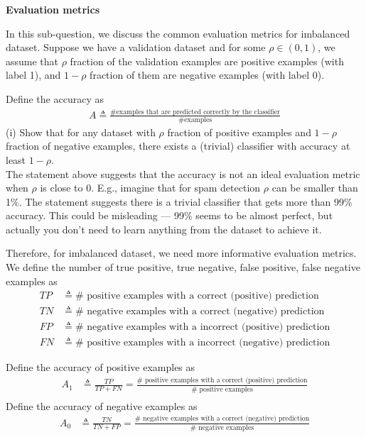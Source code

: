 \item \textbf{Evaluation metrics}

In this sub-question, we discuss the common evaluation metrics for imbalanced dataset. Suppose we have a validation dataset and for some $\rho \in (0,1)$, we assume that $\rho$ fraction of the validation examples are positive examples (with label 1), and $1-\rho$ fraction of them are negative examples (with label 0). 


Define the accuracy as
\begin{align*}
A \triangleq %
\frac{\# \textrm{examples that are predicted correctly by the classifier}}{\# \textrm{examples}} 
\end{align*}
(i)  Show that for any dataset with $\rho$ fraction of positive examples and $1-\rho$ fraction of negative examples, there exists a (trivial) classifier with accuracy at least $1-\rho$. 
\newline
\\
The statement above suggests that the accuracy is not an ideal evaluation metric when $\rho$ is close to 0. E.g., imagine that for spam detection $\rho$ can be smaller than 1\%. The statement suggests there is a trivial classifier that gets more than 99\% accuracy. This could be misleading ---  99\% seems to be almost perfect, but actually you don't need to learn anything from the dataset to achieve it. 

Therefore, for imbalanced dataset, we need more informative evaluation metrics. We define the number of true positive, true negative, false positive, false negative examples as
\begin{align*}
TP & \triangleq \# \textrm{ positive examples with a correct (positive) prediction} \\
TN & \triangleq \# \textrm{ negative examples with a correct (negative) prediction} \\
FP & \triangleq \# \textrm{ negative examples with a incorrect (positive) prediction} \\
FN & \triangleq \# \textrm{ positive examples with a incorrect (negative) prediction} 
\end{align*}

Define the accuracy of positive examples  as 
\newcommand{\recall}{\textup{recall}}
\begin{align*}
A_1 &\triangleq \frac{TP}{TP + FN} = \frac{\#  \textrm{ positive examples with a correct (positive) prediction}}{\# \textrm{ positive examples}}\nonumber\\
\end{align*}
Define the accuracy of negative examples as 
\begin{align*}
A_0 & \triangleq \frac{TN}{TN + FP} = \frac{\#  \textrm{ negative examples with a correct (negative) prediction}}{\# \textrm{ negative examples}}
\end{align*}

